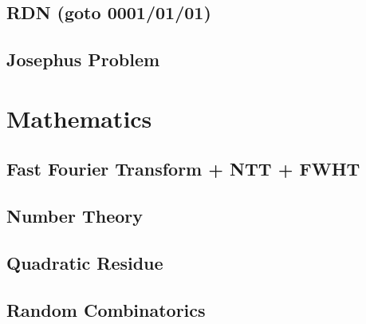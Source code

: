 \subsection{RDN (goto 0001/01/01)}


\subsection{Josephus Problem}


\section{Mathematics}

% 

\subsection{Fast Fourier Transform + NTT + FWHT}



% 

\subsection{Number Theory}


\subsection{Quadratic Residue}


\subsection{Random Combinatorics}




